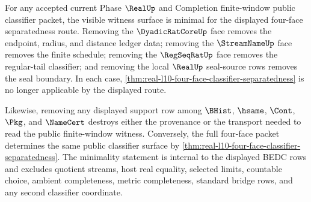 \begin{theorem}
\label{thm:real-l10-four-face-witness-minimality}
For any accepted current Phase $\RealUp$ and Completion finite-window public classifier packet, the visible witness surface is minimal for the displayed four-face separatedness route. Removing the $\DyadicRatCoreUp$ face removes the endpoint, radius, and distance ledger data; removing the $\StreamNameUp$ face removes the finite schedule; removing the $\RegSeqRatUp$ face removes the regular-tail classifier; and removing the local $\RealUp$ seal-source rows removes the seal boundary. In each case, \autoref{thm:real-l10-four-face-classifier-separatedness} is no longer applicable by the displayed route.

Likewise, removing any displayed support row among $\BHist$, $\hsame$, $\Cont$, $\Pkg$, and $\NameCert$ destroys either the provenance or the transport needed to read the public finite-window witness. Conversely, the full four-face packet determines the same public classifier surface by \autoref{thm:real-l10-four-face-classifier-separatedness}. The minimality statement is internal to the displayed BEDC rows and excludes quotient streams, host real equality, selected limits, countable choice, ambient completeness, metric completeness, standard bridge rows, and any second classifier coordinate.
\end{theorem}
